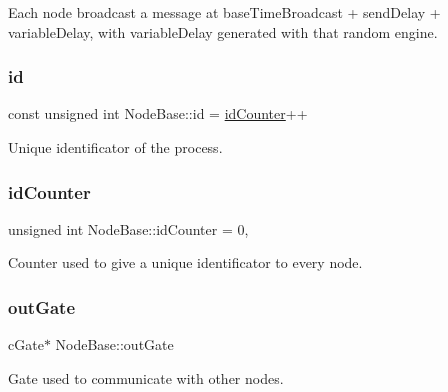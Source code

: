 Each node broadcast a message at base\+Time\+Broadcast + send\+Delay + variable\+Delay, with variable\+Delay generated with that random engine. \mbox{\label{class_node_base_a2924723bf530b8304c5e028504aafd84}} 
\subsubsection{\texorpdfstring{id}{id}}
{\footnotesize\ttfamily const unsigned int Node\+Base\+::id = \hyperlink{class_node_base_a3d577a517665ac5bcf9ed9495945fe31}{id\+Counter}++\hspace{0.3cm}{\ttfamily [protected]}}



Unique identificator of the process. 

\mbox{\label{class_node_base_a3d577a517665ac5bcf9ed9495945fe31}} 
\subsubsection{\texorpdfstring{id\+Counter}{idCounter}}
{\footnotesize\ttfamily unsigned int Node\+Base\+::id\+Counter = 0\hspace{0.3cm}{\ttfamily [static]}, {\ttfamily [private]}}



Counter used to give a unique identificator to every node. 

\mbox{\label{class_node_base_a2e86bd53e181f8b488130032da547f8e}} 
\subsubsection{\texorpdfstring{out\+Gate}{outGate}}
{\footnotesize\ttfamily c\+Gate$\ast$ Node\+Base\+::out\+Gate\hspace{0.3cm}{\ttfamily [protected]}}



Gate used to communicate with other nodes. 

\mbox{\label{class_node_base_aa6fb61208e4f5b7a841cd46fac297058}} 
